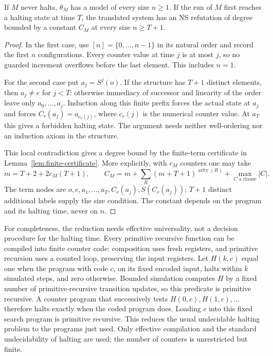 \begin{lemma}\label{lem:switch}
If $M$ never halts, $\theta_M$ has a model of every size $n\ge1$.
If the run of $M$ first reaches a halting state at time $T$, the translated system has an NS refutation of
degree bounded by a constant $C_M$ at every size $n\ge T+1$.
\end{lemma}
\begin{proof}
In the first case, use $[n]=\{0,\ldots,n-1\}$ in its natural order and
record the first $n$ configurations. Every counter value at time $j$ is at
most $j$, so no guarded increment overflows before the last element.
This includes $n=1$.

For the second case put $a_j=S^j(o)$. If the structure has $T+1$ distinct
elements, then $a_j\ne e$ for $j<T$: otherwise immediacy of successor and
linearity of the order leave only $a_0,\ldots,a_j$. Induction along this
finite prefix forces the actual state at $a_j$ and forces
$C_r(a_j)=a_{c_r(j)}$, where $c_r(j)$ is the numerical counter value.
At $a_T$ this gives a forbidden halting state. The argument needs neither
well-ordering nor an induction axiom in the structure.

This local contradiction gives a degree bound by the finite-term
certificate in Lemma~\ref{lem:finite-certificate}. More explicitly, with $c_M$
counters one may take
\[
 m=T+2+2c_M(T+1),\qquad
 C_M=m+\sum_R(m+T+1)^{\operatorname{arity}(R)}
                  +\max_{C\text{ a clause}}|C|.
\]
The term nodes are $o,e,a_1,\ldots,a_T,C_r(a_j),S(C_r(a_j))$;
$T+1$ distinct additional labels supply the size condition. The constant
depends on the program and its halting time, never on $n$.
\end{proof}

For completeness, the reduction needs effective universality, not a
decision procedure for the halting time. Every primitive recursive function
can be compiled into finite counter code: composition uses fresh registers,
and primitive recursion uses a counted loop, preserving the input registers.
Let $H(k,c)$ equal one when the program with code $c$, on its fixed
encoded input, halts within $k$ simulated steps, and zero otherwise.
Bounded simulation computes $H$ by a fixed number of primitive-recursive
transition updates, so this predicate is primitive recursive. A counter program that successively tests
$H(0,c),H(1,c),\ldots$ therefore halts exactly when the coded program does.
Loading $c$ into this fixed search program is primitive recursive. This
reduces the usual undecidable halting problem to the programs just used.
Only effective compilation and the standard undecidability of halting are used; the number of counters is unrestricted but finite.


